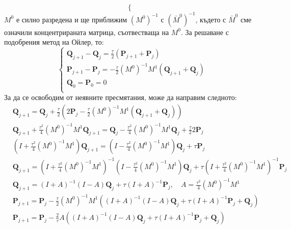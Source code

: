 \documentclass[12pt]{article}
\begin{document}
\begin{large}
\begin{equation}
\begin{cases}
    \end{cases}
\end{equation}
$M^0$ е силно разредена и ще приближим $(M^0)^{-1}$ с $(\bar{M}^0)^{-1}$, където с $\bar{M}^0$ сме означили концентрираната матрица, съотвестваща на $M^0$. За решаване с подобрения метод на Ойлер, то:
\begin{equation}
    \begin{cases}
      \mathbf{Q}_{j + 1} - \mathbf{Q}_j = \frac{\tau}{2} \left( \mathbf{P}_{j + 1} + \mathbf{P}_j \right) \\
      \mathbf{P}_{j + 1} - \mathbf{P}_j = -\frac{\tau}{2} (M^0)^{-1} M^1 \left( \mathbf{Q}_{j + 1} + \mathbf{Q}_j \right) \\
      \mathbf{Q}_0 = \mathbf{P}_0 = 0 \\
    \end{cases}
\end{equation}
За да се освободим от неявните пресмятания, може да направим следното:
\begin{align*}
&\mathbf{Q}_{j + 1} = \mathbf{Q}_j + \frac{\tau}{2} \left( 2\mathbf{P}_j -\frac{\tau}{2} (M^0)^{-1} M^1 \left( \mathbf{Q}_{j + 1} + \mathbf{Q}_j \right) \right) \\
&\mathbf{Q}_{j + 1} + \frac{\tau^2}{4} (M^0)^{-1} M^1 \mathbf{Q}_{j+1} = \mathbf{Q}_j - \frac{\tau^2}{4} (M^0)^{-1} M^1 \mathbf{Q}_j + \frac{\tau}{2} 2\mathbf{P}_j \\
&\left(I + \frac{\tau^2}{4} (M^0)^{-1} M^1 \right)\mathbf{Q}_{j + 1} = \left(I - \frac{\tau^2}{4} (M^0)^{-1} M^1 \right) \mathbf{Q}_j + \tau \mathbf{P}_j \\
&\mathbf{Q}_{j + 1} = \left(I + \frac{\tau^2}{4} (M^0)^{-1} M^1 \right)^{-1} \left(I - \frac{\tau^2}{4} (M^0)^{-1} M^1 \right) \mathbf{Q}_j + \tau \left(I + \frac{\tau^2}{4} (M^0)^{-1} M^1 \right)^{-1} \mathbf{P}_j \\
&\mathbf{Q}_{j + 1} = \left(I + A \right)^{-1} \left(I - A \right) \mathbf{Q}_j + \tau \left(I + A \right)^{-1} \mathbf{P}_j, \quad A = \frac{\tau^2}{4} (M^0)^{-1} M^1 \\
&\mathbf{P}_{j + 1} = \mathbf{P}_j -\frac{\tau}{2}  (M^0)^{-1} M^1 \left(\left(I + A \right)^{-1} \left(I - A \right) \mathbf{Q}_j + \tau \left(I + A \right)^{-1} \mathbf{P}_j + \mathbf{Q}_j \right) \\
&\mathbf{P}_{j + 1} = \mathbf{P}_j -\frac{2}{\tau} A \left(\left(I + A \right)^{-1} \left(I - A \right) \mathbf{Q}_j + \tau \left(I + A \right)^{-1} \mathbf{P}_j + \mathbf{Q}_j \right) \\

\end{align*}
\end{large}
\end{document}
